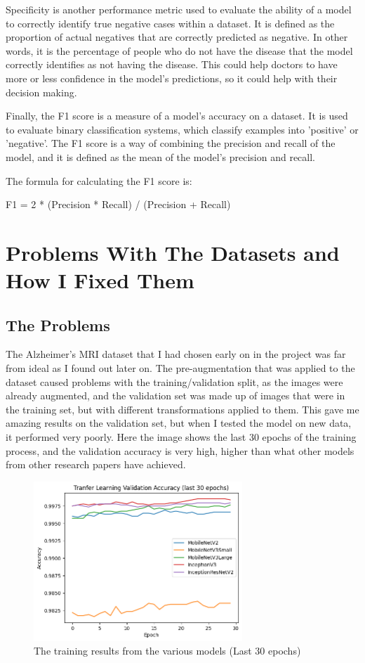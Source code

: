 \documentclass[]{final_report}
\begin{document}
Specificity is another performance metric used to evaluate the ability of a model to correctly identify true negative cases within a dataset. It is defined as the proportion of actual negatives that are correctly predicted as negative. In other words, it is the percentage of people who do not have the disease that the model correctly identifies as not having the disease. This could help doctors to have more or less confidence in the model's predictions, so it could help with their decision making.

Finally, the F1 score is a measure of a model's accuracy on a dataset. It is used to evaluate binary classification systems, which classify examples into 'positive' or 'negative'. The F1 score is a way of combining the precision and recall of the model, and it is defined as the mean of the model's precision and recall.

The formula for calculating the F1 score is:

F1 = 2 * (Precision * Recall) / (Precision + Recall)

\section{Problems With The Datasets and How I Fixed Them}

\subsection{The Problems}

The Alzheimer's MRI dataset that I had chosen early on in the project was far from ideal as I found out later on.
The pre-augmentation that was applied to the dataset caused problems with the training/validation split, as the
images were already augmented, and the validation set was made up of images that were in the training set, but
with different transformations applied to them. This gave me amazing results on the validation set, but when I
tested the model on new data, it performed very poorly. Here the image shows the last 30 epochs of the training process,
and the validation accuracy is very high, higher than what other models from other research papers have achieved.

\begin{figure}[h]
  \centering
  \includegraphics[width=0.7\textwidth]{images/bad-training-result.png}
  \caption{The training results from the various models (Last 30 epochs)}
  \label{fig:training_results}
\end{figure}
\end{document}
